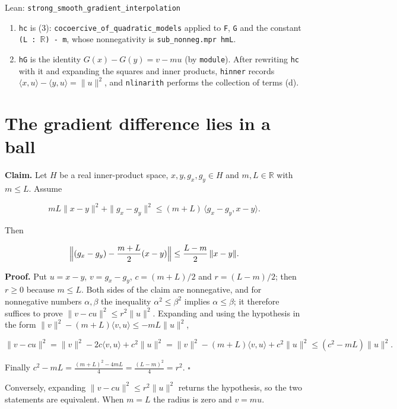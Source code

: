 \documentclass[11pt,a4paper]{article}
\begin{document}
\begin{leanbox}{Lean: \texttt{strong\_\allowbreak{}smooth\_\allowbreak{}gradient\_\allowbreak{}interpolation}}
\begin{enumerate}
\item \texttt{hc} is (3): \texttt{cocoercive\_\allowbreak{}of\_\allowbreak{}quadratic\_\allowbreak{}models} applied to \texttt{F}, \texttt{G} and the constant \texttt{(L : \ensuremath{\mathbb R}) -\allowbreak{} m}, whose nonnegativity is \texttt{sub\_\allowbreak{}nonneg.\allowbreak{}mpr hm\allowbreak{}L}.

\item \texttt{h\allowbreak{}G} is the identity \(G(x)-G(y)=v-mu\) (by \texttt{module}). After rewriting \texttt{hc} with it and expanding the squares and inner products, \texttt{hinner} records \(\langle x,u\rangle-\langle y,u\rangle=\|u\|^2\), and \texttt{nlinarith} performs the collection of terms (d).

\end{enumerate}
\end{leanbox}

\section{\texorpdfstring{The gradient difference lies in a ball}{The gradient difference lies in a ball}}


\textbf{Claim.} Let \(H\) be a real inner-product space, \(x,y,g_x,g_y\in H\) and \(m,L\in\mathbb R\) with \(m\le L\). Assume


\[mL\|x-y\|^2+\|g_x-g_y\|^2\le(m+L)\,\langle g_x-g_y,x-y\rangle.\]


Then


\[\Bigl\|(g_x-g_y)-\frac{m+L}2(x-y)\Bigr\|\le\frac{L-m}2\,\|x-y\|.\]


\textbf{Proof.} Put \(u=x-y\), \(v=g_x-g_y\), \(c=(m+L)/2\) and \(r=(L-m)/2\); then \(r\ge0\) because \(m\le L\). Both sides of the claim are nonnegative, and for nonnegative numbers \(\alpha,\beta\) the inequality \(\alpha^2\le\beta^2\) implies \(\alpha\le\beta\); it therefore suffices to prove \(\|v-cu\|^2\le r^2\|u\|^2\). Expanding and using the hypothesis in the form \(\|v\|^2-(m+L)\langle v,u\rangle\le-mL\|u\|^2\),


\[\|v-cu\|^2=\|v\|^2-2c\langle v,u\rangle+c^2\|u\|^2=\|v\|^2-(m+L)\langle v,u\rangle+c^2\|u\|^2\le(c^2-mL)\|u\|^2.\]


Finally \(c^2-mL=\frac{(m+L)^2-4mL}4=\frac{(L-m)^2}4=r^2\). \(\square\)




Conversely, expanding \(\|v-cu\|^2\le r^2\|u\|^2\) returns the hypothesis, so the two statements are equivalent. When \(m=L\) the radius is zero and \(v=mu\).
\end{document}
